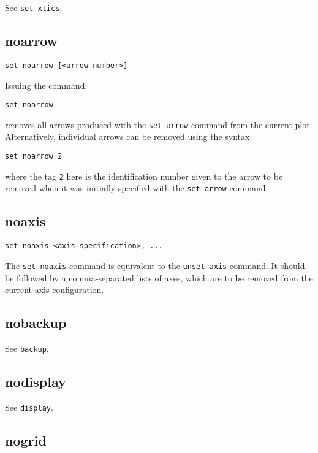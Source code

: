 See {\tt set xtics}.

\subsection{noarrow}

\begin{verbatim}
set noarrow [<arrow number>]
\end{verbatim}

Issuing the command:

\begin{verbatim}
set noarrow
\end{verbatim}

\noindent removes all arrows produced with the {\tt set arrow} command from the current
plot. Alternatively, individual arrows can be removed using the syntax:

\begin{verbatim}
set noarrow 2
\end{verbatim}

\noindent where the tag {\tt 2} here is the identification number given to
the arrow to be removed when it was initially specified with the {\tt set arrow}
command.

\subsection{noaxis}

\begin{verbatim}
set noaxis <axis specification>, ...
\end{verbatim}

The {\tt set noaxis} command is equivalent to the {\tt unset axis} command. It
should be followed by a comma-separated lists of axes, which are to be removed
from the current axis configuration.


\subsection{nobackup}

See {\tt backup}.


\subsection{nodisplay}

See {\tt display}.


\subsection{nogrid}

